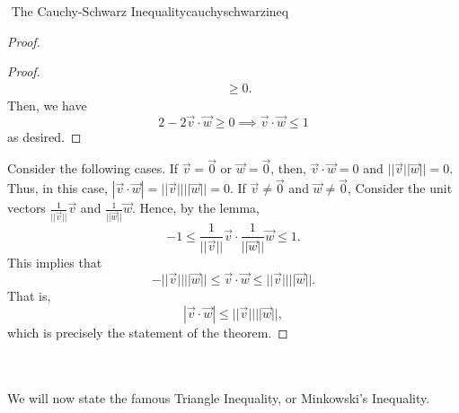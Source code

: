 \begin{theorem}{\Stop\,\,The Cauchy-Schwarz Inequality}{cauchyschwarzineq}
\begin{proof}
\begin{proof}
\begin{align*}
                        &\geq 0.
                    \end{align*}
                    Then, we have
                    \begin{equation*}
                        2-2\vec{v}\cdot\vec{w}\geq 0 \implies \vec{v}\cdot\vec{w}\leq 1
                    \end{equation*}
                    as desired.
                \end{proof}
                Consider the following cases. If \(\vec{v}=\vec{0}\) or \(\vec{w}=\vec{0}\), then, \(\vec{v}\cdot\vec{w}=0\) and \(||\vec{v}||\vec{w}||=0\). Thus, in this case, \(|\vec{v}\cdot\vec{w}|=||\vec{v}||||\vec{w}||=0\). If \(\vec{v}\neq\vec{0}\) and \(\vec{w}\neq\vec{0}\), Consider the unit vectors \(\frac{1}{||\vec{v}||}\vec{v}\) and \(\frac{1}{||\vec{w}||}\vec{w}\). Hence, by the lemma, 
                \begin{equation*}
                    -1\leq \frac{1}{||\vec{v}||}\vec{v}\cdot \frac{1}{||\vec{w}||}\vec{w} \leq 1.
                \end{equation*}
                This implies that 
                \begin{equation*}
                    -||\vec{v}||||\vec{w}||\leq\vec{v}\cdot\vec{w}\leq||\vec{v}||||\vec{w}||.
                \end{equation*}
                That is,
                \begin{equation*}
                    |\vec{v}\cdot\vec{w}|\leq||\vec{v}||||\vec{w}||,
                \end{equation*}
                which is precisely the statement of the theorem.
            \end{proof}
            
        \end{theorem}
        \pagebreak
        \vphantom
        \\
        \\
        We will now state the famous Triangle Inequality, or Minkowski's Inequality.
